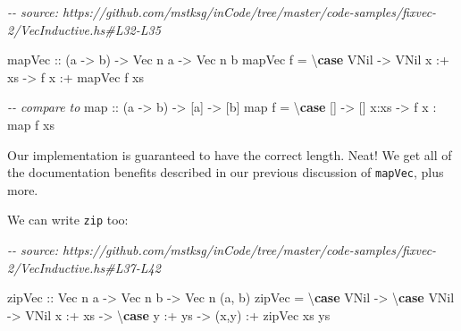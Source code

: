 \documentclass[]{article}
\newenvironment{Shaded}{}{}
\newcommand{\CommentTok}[1]{\textcolor[rgb]{0.38,0.63,0.69}{\textit{#1}}}
\newcommand{\DataTypeTok}[1]{\textcolor[rgb]{0.56,0.13,0.00}{#1}}
\newcommand{\FunctionTok}[1]{\textcolor[rgb]{0.02,0.16,0.49}{#1}}
\newcommand{\KeywordTok}[1]{\textcolor[rgb]{0.00,0.44,0.13}{\textbf{#1}}}
\newcommand{\NormalTok}[1]{#1}
\newcommand{\OperatorTok}[1]{\textcolor[rgb]{0.40,0.40,0.40}{#1}}
\newcommand{\OtherTok}[1]{\textcolor[rgb]{0.00,0.44,0.13}{#1}}
\begin{document}
\begin{Shaded}
\begin{Highlighting}[]
\CommentTok{{-}{-} source: https://github.com/mstksg/inCode/tree/master/code{-}samples/fixvec{-}2/VecInductive.hs\#L32{-}L35}

\OtherTok{mapVec ::}\NormalTok{ (a }\OtherTok{{-}>}\NormalTok{ b) }\OtherTok{{-}>} \DataTypeTok{Vec}\NormalTok{ n a }\OtherTok{{-}>} \DataTypeTok{Vec}\NormalTok{ n b}
\NormalTok{mapVec f }\OtherTok{=}\NormalTok{ \textbackslash{}}\KeywordTok{case}
    \DataTypeTok{VNil}    \OtherTok{{-}>} \DataTypeTok{VNil}
\NormalTok{    x }\OperatorTok{:+}\NormalTok{ xs }\OtherTok{{-}>}\NormalTok{ f x }\OperatorTok{:+}\NormalTok{ mapVec f xs}

\CommentTok{{-}{-} compare to}
\FunctionTok{map}\OtherTok{ ::}\NormalTok{ (a }\OtherTok{{-}>}\NormalTok{ b) }\OtherTok{{-}>}\NormalTok{ [a] }\OtherTok{{-}>}\NormalTok{ [b]}
\FunctionTok{map}\NormalTok{ f }\OtherTok{=}\NormalTok{ \textbackslash{}}\KeywordTok{case}
\NormalTok{    [] }\OtherTok{{-}>}\NormalTok{ []}
\NormalTok{    x}\OperatorTok{:}\NormalTok{xs }\OtherTok{{-}>}\NormalTok{ f x }\OperatorTok{:} \FunctionTok{map}\NormalTok{ f xs}
\end{Highlighting}
\end{Shaded}

Our implementation is guaranteed to have the correct length. Neat! We get all of
the documentation benefits described in our previous discussion of
\texttt{mapVec}, plus more.

We can write \texttt{zip} too:

\begin{Shaded}
\begin{Highlighting}[]
\CommentTok{{-}{-} source: https://github.com/mstksg/inCode/tree/master/code{-}samples/fixvec{-}2/VecInductive.hs\#L37{-}L42}

\OtherTok{zipVec ::} \DataTypeTok{Vec}\NormalTok{ n a }\OtherTok{{-}>} \DataTypeTok{Vec}\NormalTok{ n b }\OtherTok{{-}>} \DataTypeTok{Vec}\NormalTok{ n (a, b)}
\NormalTok{zipVec }\OtherTok{=}\NormalTok{ \textbackslash{}}\KeywordTok{case}
    \DataTypeTok{VNil} \OtherTok{{-}>}\NormalTok{ \textbackslash{}}\KeywordTok{case}
      \DataTypeTok{VNil} \OtherTok{{-}>} \DataTypeTok{VNil}
\NormalTok{    x }\OperatorTok{:+}\NormalTok{ xs }\OtherTok{{-}>}\NormalTok{ \textbackslash{}}\KeywordTok{case}
\NormalTok{      y }\OperatorTok{:+}\NormalTok{ ys }\OtherTok{{-}>}\NormalTok{ (x,y) }\OperatorTok{:+}\NormalTok{ zipVec xs ys}
\end{Highlighting}
\end{Shaded}
\end{document}
